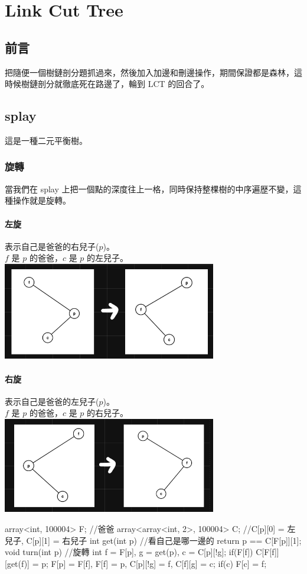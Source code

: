\chapter{Link Cut Tree}
    \section{前言}
    把隨便一個樹鏈剖分題抓過來，然後加入加邊和刪邊操作，期間保證都是森林，這時候樹鏈剖分就徹底死在路邊了，輪到 LCT 的回合了。
    \section{splay}
    這是一種二元平衡樹。
        \subsection{旋轉}
        當我們在 splay 上把一個點的深度往上一格，同時保持整棵樹的中序遍歴不變，這種操作就是旋轉。\\
            \subsubsection{左旋}
            表示自己是爸爸的右兒子($p$)。\\
            $f$ 是 $p$ 的爸爸，$c$ 是 $p$ 的左兒子。\\
            \includegraphics*[width = 0.7\textwidth]{images/LeftTurn}
            \subsubsection{右旋}
            表示自己是爸爸的左兒子($p$)。\\
            $f$ 是 $p$ 的爸爸，$c$ 是 $p$ 的右兒子。\\
            \includegraphics*[width = 0.7\textwidth]{images/RightTurn}
        \begin{C++}
        array<int, 100004> F; //爸爸
        array<array<int, 2>, 100004> C; //C[p][0] = 左兒子, C[p][1] = 右兒子
        int get(int p){ //看自己是哪一邊的
            return p == C[F[p]][1];
        }
        void turn(int p){ //旋轉
            int f = F[p], g = get(p), c = C[p][!g];
            if(F[f]) C[F[f]][get(f)] = p;
            F[p] = F[f], F[f] = p, C[p][!g] = f, C[f][g] = c;
            if(c) F[c] = f;
        }
        \end{C++}
